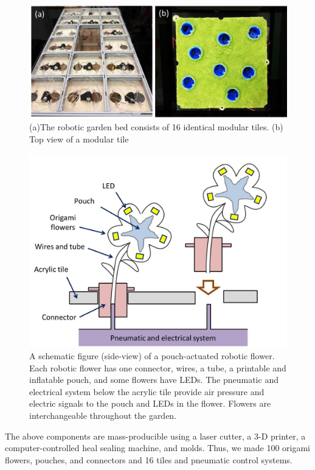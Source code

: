 \documentclass[letterpaper, 10 pt, conference]{ieeeconf}  %
\begin{document}
\begin{figure}[thpb]
	\centering
	\includegraphics[scale=.45]{tabletile.jpg}
	\caption{(a)The robotic garden bed consists of 16 identical modular tiles. (b) Top view of a modular tile}
	\label{tabletile}
\end{figure}

\begin{figure}[thpb]
	\centering
	\includegraphics[scale=.4]{connector.jpg}
	\caption{A schematic figure (side-view) of a pouch-actuated robotic flower. Each robotic flower has one connector, wires, a tube, a printable and inflatable pouch, and some flowers have LEDs. The pneumatic and electrical system below the acrylic tile provide air pressure and electric signals to the pouch and LEDs in the flower. Flowers are interchangeable throughout the garden. }
	\label{connector}
\end{figure}   

The above components are mass-producible using a laser cutter, a 3-D printer, a computer-controlled heal sealing machine, and molds.  Thus, we made 100 origami flowers, pouches, and connectors and 16 tiles and pneumatic control systems. 
\end{document}
